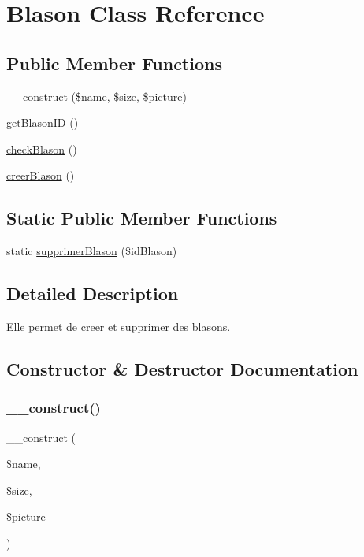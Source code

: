 \hypertarget{class_blason}{}\section{Blason Class Reference}
\label{class_blason}
\subsection*{Public Member Functions}
\begin{DoxyCompactItemize}
\item 
\mbox{\hyperlink{class_blason_a62654ef6cf9e12513cc17b04feb46c93}{\+\_\+\+\_\+construct}} (\$name, \$size, \$picture)
\item 
\mbox{\hyperlink{class_blason_a96b6dda0a842d67dbb65e6b8b8dd6206}{get\+Blason\+ID}} ()
\item 
\mbox{\hyperlink{class_blason_af5a3b3d56747a27b6f8badd4ad61315b}{check\+Blason}} ()
\item 
\mbox{\hyperlink{class_blason_add2b995df755d22b314982b6f724ed2b}{creer\+Blason}} ()
\end{DoxyCompactItemize}
\subsection*{Static Public Member Functions}
\begin{DoxyCompactItemize}
\item 
static \mbox{\hyperlink{class_blason_a9c1e328f5f4101eeb999f9b664a8cdcf}{supprimer\+Blason}} (\$id\+Blason)
\end{DoxyCompactItemize}


\subsection{Detailed Description}
Elle permet de creer et supprimer des blasons. 

\subsection{Constructor \& Destructor Documentation}
\mbox{\label{class_blason_a62654ef6cf9e12513cc17b04feb46c93}} 
\subsubsection{\texorpdfstring{\+\_\+\+\_\+construct()}{\_\_construct()}}
{\footnotesize\ttfamily \+\_\+\+\_\+construct (\begin{DoxyParamCaption}\item[{}]{\$name,  }\item[{}]{\$size,  }\item[{}]{\$picture }\end{DoxyParamCaption})}

